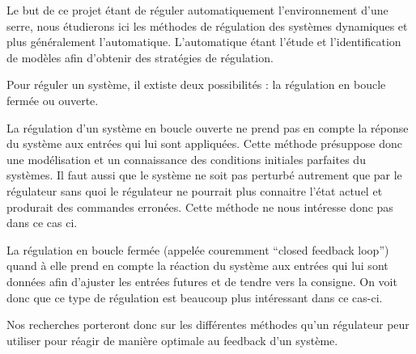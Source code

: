 
Le but de ce projet étant de réguler automatiquement l'environnement d'une serre, nous étudierons ici les méthodes de régulation des systèmes dynamiques et plus généralement l'automatique.
L'automatique étant l'étude et l'identification de modèles afin d'obtenir des stratégies de régulation.

Pour réguler un système, il extiste deux possibilités : la régulation en boucle fermée ou ouverte.

La régulation d'un système en boucle ouverte ne prend pas en compte la réponse du système aux entrées qui lui sont appliquées. Cette méthode présuppose donc une modélisation et un connaissance  des conditions initiales parfaites du systèmes. Il faut aussi que le système ne soit pas perturbé autrement que par le régulateur sans quoi le régulateur ne pourrait plus connaitre l'état actuel et produrait des commandes erronées. Cette méthode ne nous intéresse donc pas dans ce cas ci.

La régulation en boucle fermée (appelée couremment ``closed feedback loop'') quand à elle prend en compte la réaction du système aux entrées qui lui sont données afin d'ajuster les entrées futures et de tendre vers la consigne. On voit donc que ce type de régulation est beaucoup plus intéressant dans ce cas-ci.

Nos recherches porteront donc sur les différentes méthodes qu'un régulateur peur utiliser pour réagir de manière optimale au feedback d'un système.
